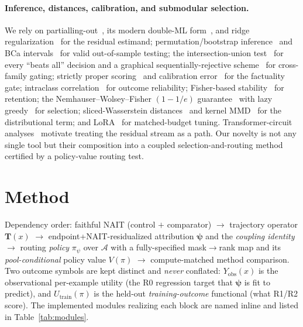 \documentclass[11pt]{article}
\theoremstyle{definition}
\newcommand{\Tmat}{\mathbf{T}}
\newcommand{\Aset}{\mathcal{A}}
\newcommand{\psivec}{\bm{\psi}}
\newcommand{\Utr}{U_{\mathrm{train}}}
\newcommand{\Vpol}{V}
\begin{document}
\paragraph{Inference, distances, calibration, and submodular selection.}
We rely on partialling-out~\cite{frisch1933partial,lovell1963seasonal}, its modern
double-ML form~\cite{chernozhukov2018double}, and ridge
regularization~\cite{hoerl1970ridge} for the residual estimand;
permutation/bootstrap inference~\cite{good2005permutation,efron1993bootstrap,hall1988bootstrap}
and BCa intervals~\cite{efron1987bca} for valid out-of-sample testing; the
intersection-union test~\cite{berger1982iut} for every ``beats all'' decision and a
graphical sequentially-rejective scheme~\cite{bretz2009graphical,holm1979simple} for
cross-family gating; strictly proper scoring~\cite{brier1950verification,gneiting2007strictly}
and calibration error~\cite{guo2017calibration} for the factuality gate; intraclass
correlation~\cite{shrout1979intraclass} for outcome reliability; Fisher-based
stability~\cite{kirkpatrick2017ewc} for retention; the Nemhauser--Wolsey--Fisher
$(1-1/e)$ guarantee~\cite{nemhauser1978submodular} with lazy
greedy~\cite{minoux1978accelerated,wei2015submodular} for selection; sliced-Wasserstein
distances~\cite{bonneel2015sliced,kolouri2019gsw,villani2009optimal} and kernel
MMD~\cite{gretton2012mmd} for the distributional term; and LoRA~\cite{hu2022lora} for
matched-budget tuning. Transformer-circuit analyses~\cite{elhage2021mathematical}
motivate treating the residual stream as a path. Our novelty is not any single tool but
their composition into a coupled selection-and-routing method certified by a policy-value
routing test.

\section{Method}
\label{sec:method}

Dependency order: faithful NAIT (control $+$ comparator) $\to$ trajectory operator
$\Tmat(x)$ $\to$ endpoint+NAIT-residualized attribution $\psivec$ and the \emph{coupling
identity} $\to$ routing \emph{policy} $\pi_\psi$ over $\Aset$ with a fully-specified
mask$\to$rank map and its \emph{pool-conditional} policy value $\Vpol(\pi)$ $\to$
compute-matched method comparison. Two outcome symbols are kept distinct and \emph{never}
conflated: $Y_{\mathrm{obs}}(x)$ is the observational per-example utility (the R0
regression target that $\psivec$ is fit to predict), and $\Utr(\pi)$ is the held-out
\emph{training-outcome} functional (what R1/R2 score). The implemented modules realizing
each block are named inline and listed in Table~\ref{tab:modules}.
\end{document}
